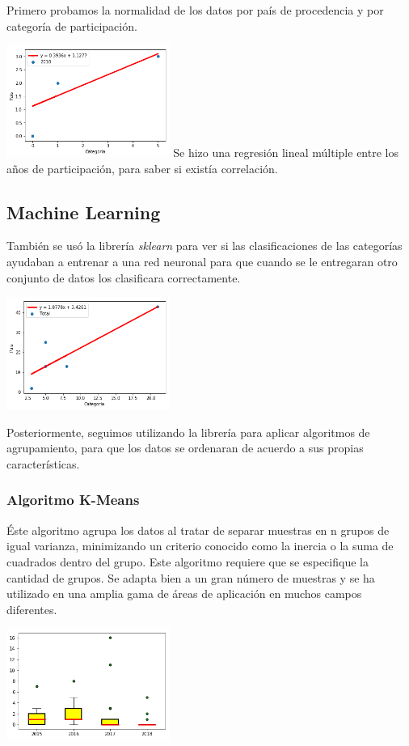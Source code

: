 \documentclass[5p,times]{elsarticle}
\begin{document}
Primero probamos la normalidad de los datos por país de procedencia y por categoría de participación.


\includegraphics[width=0.4\textwidth]{03}
Se hizo una regresión lineal múltiple entre los años de participación, para saber si existía correlación.


\subsection*{Machine Learning}
También se usó la librería \textit{sklearn} para ver si las clasificaciones de las categorías ayudaban a entrenar a una red neuronal para que cuando se le entregaran otro conjunto de datos los clasificara correctamente.


\includegraphics[width=0.4\textwidth]{04}


Posteriormente, seguimos utilizando la librería para aplicar algoritmos de agrupamiento, para que los datos se ordenaran de acuerdo a sus propias características.

\subsubsection*{Algoritmo K-Means}

Éste algoritmo agrupa los datos al tratar de separar muestras en n grupos de igual varianza, minimizando un criterio conocido como la inercia o la suma de cuadrados dentro del grupo. Este algoritmo requiere que se especifique la cantidad de grupos. Se adapta bien a un gran número de muestras y se ha utilizado en una amplia gama de áreas de aplicación en muchos campos diferentes.

\includegraphics[width=0.4\textwidth]{05}
\end{document}
